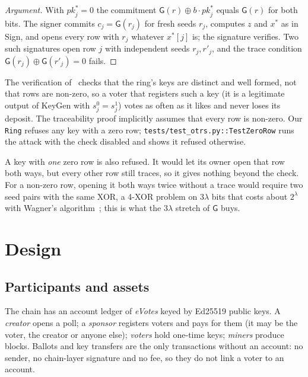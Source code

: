 \documentclass[11pt,a4paper]{article}
\newcommand{\pk}{\mathit{pk}}
\newcommand{\Gf}{\mathsf{G}}
\newcommand{\Sign}{\textsf{Sign}}
\newcommand{\KeyGen}{\textsf{KeyGen}}
\theoremstyle{definition}
\begin{document}
\begin{proof}[Argument]
With $\pk^\ast_j = 0$ the commitment $\Gf(r) \oplus b \cdot \pk^\ast_j$
equals $\Gf(r)$ for both bits. The signer commits $c_j = \Gf(r_j)$ for
fresh seeds $r_j$, computes $z$ and $x^\ast$ as in \Sign, and opens every
row with $r_j$ whatever $x^\ast[j]$ is; the signature verifies. Two such
signatures open row $j$ with independent seeds $r_j, r'_j$, and the trace
condition $\Gf(r_j) \oplus \Gf(r'_j) = 0$ fails.
\end{proof}

The verification of~\cite[Fig.~1]{SZ21} checks that the ring's keys are
distinct and well formed, not that rows are non-zero, so a voter that
registers such a key (it is a legitimate output of \KeyGen{} with
$s^0_j = s^1_j$) votes as often as it likes and never loses its deposit.
The traceability proof implicitly assumes that every row is non-zero.
Our \texttt{Ring} refuses any key with a zero row;
\texttt{tests/test\_otrs.py::TestZeroRow} runs the attack with the check
disabled and shows it refused otherwise.

A key with \emph{one} zero row is also refused. It would let its owner
open that row both ways, but every other row still traces, so it gives
nothing beyond the check. For a non-zero row, opening it both ways twice
without a trace would require two seed pairs with the same XOR, a 4-XOR
problem on $3\lambda$ bits that costs about $2^\lambda$ with Wagner's
algorithm~\cite{Wagner02}; this is what the $3\lambda$ stretch of $\Gf$
buys.

\section{Design}
\label{sec:design}

\subsection{Participants and assets}

The chain has an account ledger of \emph{eVotes} keyed by Ed25519 public
keys. A \emph{creator} opens a poll; a \emph{sponsor} registers voters and
pays for them (it may be the voter, the creator or anyone else);
\emph{voters} hold one-time keys; \emph{miners} produce blocks. Ballots
and key transfers are the only transactions without an account: no
sender, no chain-layer signature and no fee, so they do not link a voter
to an account.
\end{document}
